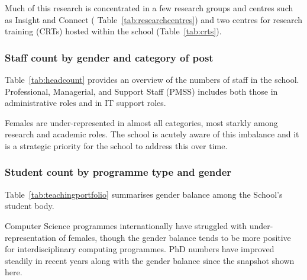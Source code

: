 Much of this research is concentrated in a few 
research groups and centres such as Insight and Connect 
( Table~\ref{tab:researchcentres}) and two centres for research 
training (CRTs) hosted within the school 
(Table~\ref{tab:crts}). 






\subsubsection{Staff count by gender and category of post}

Table~\ref{tab:headcount} provides an overview of the numbers of staff 
in the school. Professional, Managerial, and Support Staff (PMSS) 
includes both those in administrative roles and in IT support roles.  
%

%
Females are under-represented in almost all categories, most 
starkly among research and  academic roles. The school is acutely 
aware of this imbalance  and it is a strategic priority for the 
school to address this over time.

\subsubsection{Student count by programme type and gender}

Table~\ref{tab:teachingportfolio} summarises gender balance among
the School's student body. 

Computer Science programmes internationally have  struggled with 
under-representation of females, though the gender balance tends to
be more positive for interdisciplinary computing programmes. 
PhD numbers have improved steadily in recent years along with
the gender balance since the snapshot shown here.




% 

